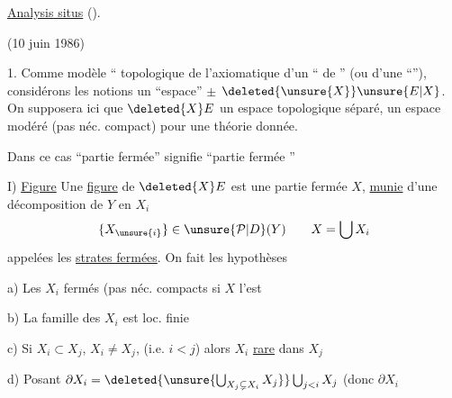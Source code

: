 \uline{Analysis situs} ().

(10 juin 1986)

1. Comme modèle `` topologique de l'axiomatique d'un `` de  '' (ou d'une ``\uline{}''),
considérons les notions    un ``espace'' $\pm$  $\deleted{\unsure{X}}\unsure{E|X}$.
On supposera ici que $\deleted{X}E$  un espace topologique séparé,  un espace modéré (pas néc. compact) pour une théorie  donnée.

Dans ce cas ``partie fermée'' signifie ``partie fermée ''

I) \uline{Figure} \qquad Une \uline{figure}  de $\deleted{X}E$ est une partie fermée $X$, \uline{munie} d'une
décomposition de $Y$ en   $X_i$
\[
\{X_{\unsure{i}}\}\in\unsure{\mathcal{P}|D}(Y) \qquad X=\bigcup X_i
\]
appelées les \uline{strates fermées}. On fait les hypothèses

a) Les $X_i$ fermés  (pas néc. compacts \unsure{\}}   si $X$ l'est\unsure{)}

b) La famille des $X_i$ est loc. finie

c) Si   $X_i\subset X_j$, $X_i\ne X_j$, (i.e. $i<j$) alors $X_i$ \uline{rare} dans $X_j$

d) Posant $\partial X_i=\deleted{\unsure{\bigcup_{X_j\subsetneq X_i}X_j}}\bigcup_{j<i}X_j$ (donc $\partial X_i$
